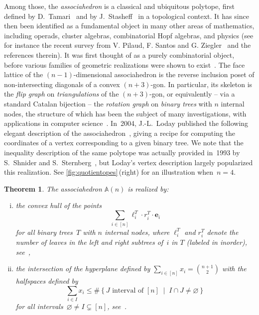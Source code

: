 \documentclass{amsart}
\newtheorem{theorem}{Theorem}%
\theoremstyle{definition}
\newcommand{\R}{\mathbb{R}} %
\renewcommand{\b}[1]{{\boldsymbol{#1}}} %
\newcommand{\set}[2]{\left\{ #1 \;\middle|\; #2 \right\}} %
\newcommand{\darkblue}{\color{darkblue}} %
\newcommand{\defn}[1]{\textsl{\darkblue #1}} %
\newcommand{\polytope}[1]{\mathds{#1}} %
\newcommand{\Asso}{\polytope{A}} %
\begin{document}
Among those, the \defn{associahedron} is a classical and ubiquitous polytope, first defined by D.~Tama\-ri~\cite{T51} and by J.~Stasheff~\cite{S63} in a topological context.
It has since then been identified as a fundamental object in many other areas of mathematics, including operads, cluster algebras, combinatorial Hopf algebras, and physics (see for instance the recent survey from V. Pilaud, F. Santos and G. Ziegler~\cite{PilaudSantosZiegler} and the references therein).
It was first thought of as a purely combinatorial object, before various families of geometric realizations were shown to exist~\cite{MR1022776,MR1941227,MR2108555,MR3437894,MR2321739}.
The face lattice of the $(n-1)$-dimensional associahedron is the reverse inclusion poset of non-intersecting diagonals of a convex $(n+3)$-gon.
In particular, its skeleton is the \defn{flip graph} on \defn{triangulations} of the $(n+3)$-gon, or equivalently -- via a standard Catalan bijection -- the \defn{rotation graph} on \defn{binary trees} with $n$ internal nodes, the structure of which has been the subject of many investigations, with applications in computer science~\cite{MR928904,MR3197650}.
In~2004, J.-L.~Loday published the following elegant description of the associahedron~\cite{MR2108555}, giving a recipe for computing the coordinates of a vertex corresponding to a given binary tree.
We note that the inequality description of the same polytope was actually provided in~1993 by S.~Shnider and S.~Sternberg~\cite{ShniderSternberg}, but Loday's vertex description largely popularized this realization.
See \cref{fig:quotientopes}\,(right) for an illustration when~$n = 4$.

\begin{theorem}
  \label{thm:loday}
    The associahedron $\Asso (n)$ is realized by:
  \begin{enumerate}[(i)]
  \item the convex hull of the points
    \[
    \sum_{i\in [n]} \ell^T_i\cdot r^T_i \cdot \b{e}_i
    \]
    for all binary trees~$T$ with $n$ internal nodes, where $\ell^T_i$ and $r^T_i$ denote the number of leaves in the left and right subtrees of~$i$ in $T$ (labeled in inorder), see~\cite{MR2108555},
  \item the intersection of the hyperplane defined by $\sum_{i \in [n]} x_i = \binom{n+1}{2}$ with the halfspaces defined by
    \[
    \sum_{i \in I} x_i \le \#\set{J \text{ interval of } [n]}{I \cap J \ne \varnothing}
    \]
    for all intervals~$\varnothing \ne I \subsetneq [n]$, see~\cite{ShniderSternberg}.
  \end{enumerate}
\end{theorem}
\end{document}
